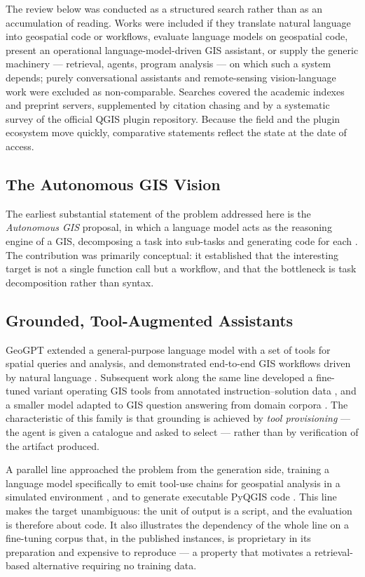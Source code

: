 The review below was conducted as a structured search rather than as an
accumulation of reading. Works were included if they translate natural language
into geospatial code or workflows, evaluate language models on geospatial code,
present an operational language-model-driven GIS assistant, or supply the
generic machinery --- retrieval, agents, program analysis --- on which such a
system depends; purely conversational assistants and remote-sensing
vision-language work were excluded as non-comparable. Searches covered the
academic indexes and preprint servers, supplemented by citation chasing and by
a systematic survey of the official QGIS plugin repository. Because the field
and the plugin ecosystem move quickly, comparative statements reflect the state
at the date of access.

\subsection{The Autonomous GIS Vision}

The earliest substantial statement of the problem addressed here is the
\emph{Autonomous GIS} proposal, in which a language model acts as the reasoning
engine of a GIS, decomposing a task into sub-tasks and generating code for each
\cite{li2023autonomousgis}. The contribution was primarily conceptual: it
established that the interesting target is not a single function call but a
workflow, and that the bottleneck is task decomposition rather than syntax.

\subsection{Grounded, Tool-Augmented Assistants}

GeoGPT extended a general-purpose language model with a set of tools for
spatial queries and analysis, and demonstrated end-to-end GIS workflows driven
by natural language \cite{zhang2023geogpt}. Subsequent work along the same line
developed a fine-tuned variant operating GIS tools from annotated
instruction--solution data \cite{wei2024geotoolgpt}, and a smaller model adapted
to GIS question answering from domain corpora \cite{zhang2024bbgeogpt}. The
characteristic of this family is that grounding is achieved by \emph{tool
provisioning} --- the agent is given a catalogue and asked to select --- rather
than by verification of the artifact produced.

A parallel line approached the problem from the generation side, training a
language model specifically to emit tool-use chains for geospatial analysis in
a simulated environment \cite{zhang2024geollmtooluse}, and to generate
executable PyQGIS code \cite{mansourian2024chatgeoai}. This line makes the
target unambiguous: the unit of output is a script, and the
evaluation is therefore about code. It also illustrates the dependency of the
whole line on a fine-tuning corpus that, in the published instances, is
proprietary in its preparation and expensive to reproduce --- a property that
motivates a retrieval-based alternative requiring no training data.

